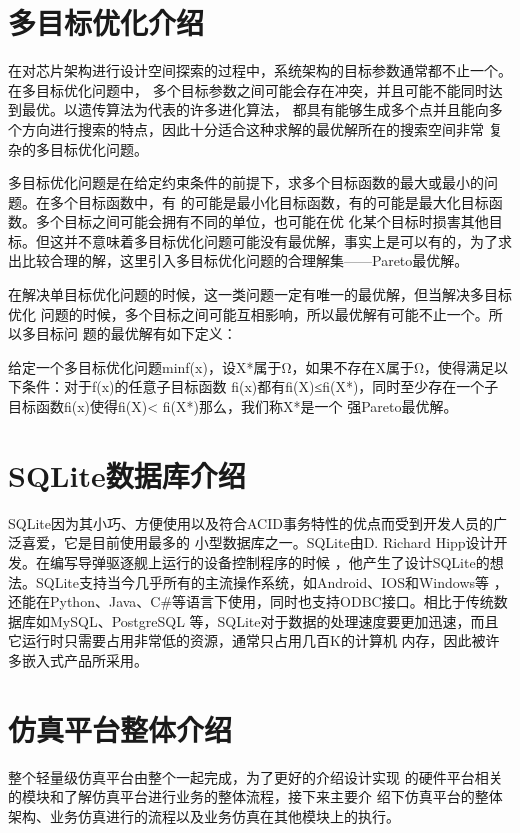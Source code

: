   \section{多目标优化介绍}
  在对芯片架构进行设计空间探索的过程中，系统架构的目标参数通常都不止一个。在多目标优化问题中，
  多个目标参数之间可能会存在冲突，并且可能不能同时达到最优。以遗传算法为代表的许多进化算法\cite{20}，
  都具有能够生成多个点并且能向多个方向进行搜索的特点，因此十分适合这种求解的最优解所在的搜索空间非常
  复杂的多目标优化问题\cite{21}。

  多目标优化问题是在给定约束条件的前提下，求多个目标函数的最大或最小的问题\cite{22}。在多个目标函数中，有
  的可能是最小化目标函数，有的可能是最大化目标函数。多个目标之间可能会拥有不同的单位，也可能在优
  化某个目标时损害其他目标。但这并不意味着多目标优化问题可能没有最优解，事实上是可以有的，为了求
  出比较合理的解，这里引入多目标优化问题的合理解集——Pareto最优解\cite{23}。

  在解决单目标优化问题的时候，这一类问题一定有唯一的最优解，但当解决多目标优化
  问题的时候，多个目标之间可能互相影响，所以最优解有可能不止一个。所以多目标问
  题的最优解有如下定义：

  给定一个多目标优化问题minf(x)，设X*属于Ω，如果不存在X属于Ω，使得满足以下条件：对于f(x)的任意子目标函数
  fi(x)都有fi(X)≤fi(X*)，同时至少存在一个子目标函数fi(x)使得fi(X)< fi(X*)那么，我们称X*是一个
  强Pareto最优解\cite{24}。

  \section{SQLite数据库介绍}
  SQLite因为其小巧、方便使用以及符合ACID事务特性的优点而受到开发人员的广泛喜爱，它是目前使用最多的
  小型数据库之一\cite{25}。SQLite由D. Richard Hipp设计开发。在编写导弹驱逐舰上运行的设备控制程序的时候
  ，他产生了设计SQLite的想法\cite{26}。SQLite支持当今几乎所有的主流操作系统，如Android、IOS和Windows等
  ，还能在Python、Java、C\#等语言下使用，同时也支持ODBC接口。相比于传统数据库如MySQL、PostgreSQL 
  等，SQLite对于数据的处理速度要更加迅速\cite{27}，而且它运行时只需要占用非常低的资源，通常只占用几百K的计算机
  内存，因此被许多嵌入式产品所采用。

  \section{仿真平台整体介绍}
  整个轻量级仿真平台由整个一起完成，为了更好的介绍设计实现
  的硬件平台相关的模块和了解仿真平台进行业务的整体流程，接下来主要介
  绍下仿真平台的整体架构、业务仿真进行的流程以及业务仿真在其他模块上的执行。

